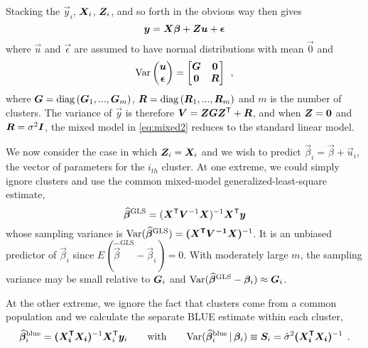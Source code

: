 Stacking the $\vec{y}_i$, $\bm{X}_i$, $\bm{Z}_i$, and so forth in the obvious way then gives
\begin{equation}\label{eq:mixed2}
 \bm{y} = \bm{X} \bm{\beta} + \bm{Z} \bm{u} + \bm{\epsilon}
\end{equation}
where $\vec{u}$ and $\vec{\epsilon}$ are assumed to have normal distributions with mean $\vec{0}$
and
\begin{equation}\label{eq:mixed3}
 \mathrm{Var}
      \begin{pmatrix}
       \bm{u} \\ \bm{\epsilon}
      \end{pmatrix}
      =
      \begin{bmatrix}
      \bm{G} & \bm{0} \\ \bm{0} & \bm{R}
      \end{bmatrix} \:\: ,
\end{equation}
where $ \bm{G} = \mathrm{diag}\, (\bm{G}_1,...,\bm{G}_m)$, $\bm{R} = \mathrm{diag}\, (\bm{R}_1,...,\bm{R}_m)$ and $m$ is the number of clusters.  
The variance of $\vec{y}$ is therefore $\bm{V} = \bm{Z} \bm{G} \bm{Z}^\mathsf{T} + \bm{R}$, and when
$\bm{Z} = \bm{0}$ and $\bm{R} = \sigma^2 \bm{I}$, the mixed model in \eqref{eq:mixed2} reduces to the
standard linear model.


We now consider the case in which 
$\bm{Z}_i = \bm{X}_i$ and we wish to predict $\vec{\beta}_i = \vec{\beta} + \vec{u}_i$, the vector of parameters for the $i_{th}$ cluster. 
At one extreme, we could simply ignore clusters and use the common mixed-model generalized-least-square estimate,
\begin{equation}\label{eq:mixed4}
 \widehat{\bm{\beta}}^{\textrm{GLS}} = (\bm{X}^\mathsf{T} \bm{V}^{-1} \bm{X})^{-1} \bm{X}^\mathsf{T} \bm{y}
\end{equation}
whose sampling variance is $\mathrm{Var}(\widehat{\bm{\beta}}^{\textrm{GLS}}) = \bm{(\bm{X}^\mathsf{T} \bm{V}^{-1} \bm{X})}^{-1}$. 
It is an unbiased predictor of $\vec{\beta}_i$ since $E( \widehat{\vec{\beta}}^{\textrm{GLS}} - \vec{\beta}_i) = 0$. 
With moderately large $m$, the sampling variance may be small relative to $\bm{G}_i$ and 
$\mathrm{Var}(\widehat{\bm{\beta}}^{\textrm{GLS}} - \bm{\beta}_i) \approx \bm{G}_i$.

At the other extreme, we ignore the fact that clusters come from a common population and we calculate the separate 
BLUE estimate within each cluster,
\begin{equation}\label{eq:mixed5}
 \widehat{\bm{\beta}}^{\textrm{blue}}_i = \bm{(\bm{X}_i^\mathsf{T} \bm{X}_i)}^{-1} \bm{X}_i^\mathsf{T} \bm{y}_i
 \quad\quad \textrm{with} \quad\quad
 \mathrm{Var}(\widehat{\bm{\beta}}^{\textrm{blue}}_i \, | \, \bm{\beta}_i) \equiv \bm{S}_i = 
 \hat{\sigma}^2 \bm{(\bm{X}_i^\mathsf{T} \bm{X}_i)}^{-1} \:\: .
\end{equation}

